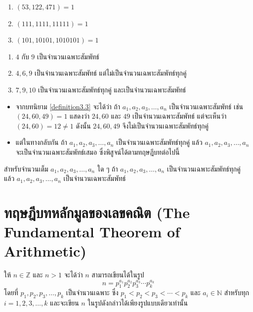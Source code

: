 \begin{examplebox}
	\begin{enumerate}
		\item $(53, 122, 471) = 1$
		\item $(111, 1111, 11111) = 1$
		\item $(101, 10101, 1010101) = 1$
	\end{enumerate}
\end{examplebox}

\begin{examplebox}
	\begin{enumerate}
		\item $4$ กับ $9$ เป็นจำนวนเฉพาะสัมพัทธ์
		\item $4, 6, 9$ เป็นจำนวนเฉพาะสัมพัทธ์ แต่ไม่เป็นจำนวนเฉพาะสัมพัทธ์ทุกคู่
		\item $7, 9, 10$ เป็นจำนวนเฉพาะสัมพัทธ์ทุกคู่ และเป็นจำนวนเฉพาะสัมพัทธ์
	\end{enumerate}
\end{examplebox}

\remark 
\begin{itemize}
	\item จากบทนิยาม \ref{definition3.3} จะได้ว่า ถ้า $a_1, a_2, a_3, \ldots, a_n$ เป็นจำนวนเฉพาะสัมพัทธ์ เช่น $(24, 60, 49) = 1$ แสดงว่า $24, 60$ และ $49$ เป็นจำนวนเฉพาะสัมพัทธ์ แต่จะเห็นว่า $(24, 60) = 12 \neq 1$ ดังนั้น $24, 60, 49$ จึงไม่เป็นจำนวนเฉพาะสัมพัทธ์ทุกคู่ 
	\item แต่ในทางกลับกัน ถ้า $a_1, a_2, a_3, \ldots, a_n$ เป็นจำนวนเฉพาะสัมพัทธ์ทุกคู่ แล้ว $a_1, a_2, a_3, \ldots, a_n$ จะเป็นจำนวนเฉพาะสัมพัทธ์เสมอ ซึ่งพิสูจน์ได้ตามทฤษฎีบทต่อไปนี้
\end{itemize}

\begin{theorembox}
	สำหรับจำนวนเต็ม $a_1, a_2, a_3, \ldots, a_n$ ใด ๆ ถ้า $a_1, a_2, a_3, \ldots, a_n$ เป็นจำนวนเฉพาะสัมพัทธ์ทุกคู่ แล้ว $a_1, a_2, a_3, \ldots, a_n$ เป็นจำนวนเฉพาะสัมพัทธ์
\end{theorembox}
\newpage

\section{ทฤษฎีบทหลักมูลของเลขคณิต (The Fundamental Theorem of Arithmetic)}
\begin{theorembox}
	ให้ $n \in \mathbb{Z}$ และ $n > 1$ จะได้ว่า $n$ สามารถเขียนได้ในรูป 
	\[ n = p_1^{a_1} p_2^{a_2} p_3^{a_3} \cdots p_k^{a_k} \]
	โดยที่ $p_1, p_2, p_3, \ldots, p_k$ เป็นจำนวนเฉพาะ ซึ่ง $p_1 < p_2 < p_3 < \cdots < p_k$ และ $a_i \in \mathbb{N}$ สำหรับทุก $i = 1, 2, 3, \ldots, k$ และจะเขียน $n$ ในรูปดังกล่าวได้เพียงรูปแบบเดียวเท่านั้น
\end{theorembox}

